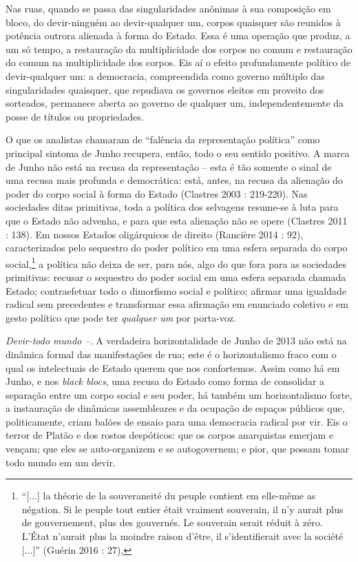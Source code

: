 Nas ruas, quando se passa das singularidades anônimas à sua composição
em bloco, do devir-ninguém ao devir-qualquer um, corpos quaisquer são
reunidos à potência outrora alienada à forma do Estado. Essa é uma
operação que produz, a um só tempo, a restauração da multiplicidade dos
corpos no comum e restauração do comum na multiplicidade dos corpos. Eis
aí o efeito profundamente político de devir-qualquer um: a democracia,
compreendida como governo múltiplo das singularidades quaisquer, que
repudiava os governos eleitos em proveito dos sorteados, permanece
aberta ao governo de qualquer um, independentemente da posse de títulos
ou propriedades.

O que os analistas chamaram de ``falência da representação política''
como principal sintoma de Junho recupera, então, todo o seu sentido
positivo. A marca de Junho não está na recusa da representação -- esta é
tão somente o sinal de uma recusa mais profunda e democrática: está,
antes, na recusa da alienação do poder do corpo social à forma do Estado
(Clastres 2003 : 219-220). Nas sociedades ditas primitivas, toda a
política dos selvagens resume-se à luta para que o Estado não advenha, e
para que esta alienação não se opere (Clastres 2011 : 138). Em nossos
Estados oligárquicos de direito (Rancière 2014 : 92), caracterizados
pelo sequestro do poder político em uma esfera separada do corpo
social,\footnote{``{[}...{]} la théorie de la souveraneité du peuple
  contient em elle-même as négation. Si le peuple tout entier était
  vraiment souverain, il n'y aurait plus de gouvernement, plus des
  gouvernés. Le souverain serait réduit à zéro. L'État n'aurait plus la
  moindre raison d'être, il s'identifierait avec la société {[}...{]}''
  (Guérin 2016 : 27),} a política não deixa de ser, para nós, algo do
que fora para as sociedades primitivas: recusar o sequestro do poder
social em uma esfera separada chamada Estado; contraefetuar todo o
dimorfismo social e político; afirmar uma igualdade radical sem
precedentes e transformar essa afirmação em enunciado coletivo e em
gesto político que pode ter \emph{qualquer um }por porta-voz.

\emph{Devir-todo mundo --. }A verdadeira horizontalidade de Junho de
2013 não está na dinâmica formal das manifestações de rua; este é o
horizontalismo fraco com o qual os intelectuais de Estado querem que nos
confortemos. Assim como há em Junho, e nos \emph{black blocs}, uma
recusa do Estado como forma de consolidar a separação entre um corpo
social e seu poder, há também um horizontalismo forte, a instauração de
dinâmicas assembleares e da ocupação de espaços públicos que,
politicamente, criam balões de ensaio para uma democracia radical por
vir. Eis o terror de Platão e dos rostos despóticos: que os corpos
anarquistas emerjam e vençam; que eles se auto-organizem e se
autogovernem; e pior, que possam tomar todo mundo em um devir.

